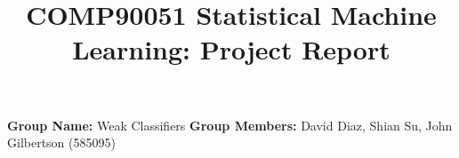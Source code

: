 \documentclass[a4paper]{article}
\title{COMP90051 Statistical Machine Learning: Project Report}
\author{}
\date{}
\begin{document}
\maketitle

\textbf{Group Name:} Weak Classifiers
\newline \textbf{Group Members:} David Diaz, Shian Su, John Gilbertson (585095)
\end{document}
